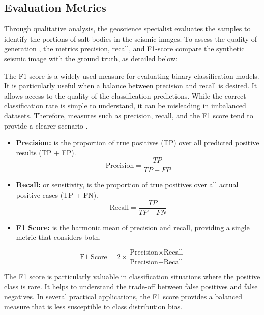 \documentclass{ieeeaccess}
\begin{document}
\subsection{Evaluation Metrics}

Through qualitative analysis, the geoscience specialist evaluates the samples to identify the portions of salt bodies in the seismic images. To assess the quality of generation , the metrics precision, recall, and F1-score compare the synthetic seismic image with the ground truth, as detailed below:

The F1 score is a widely used measure for evaluating binary classification models. It is particularly useful when a balance between precision and recall is desired. It allows access to the quality of the classification predictions. While the correct classification rate is simple to understand, it can be misleading in imbalanced datasets. Therefore, measures such as precision, recall, and the F1 score tend to provide a clearer scenario \cite{ref14}.

\begin{itemize}
    \item \textbf{Precision:} is the proportion of true positives (TP) over all predicted positive results (TP + FP).
    \begin{equation}
    \text{Precision} = \frac{TP}{TP + FP}
    \end{equation}

    \item \textbf{Recall:} or sensitivity, is the proportion of true positives over all actual positive cases (TP + FN).
    \begin{equation}
    \text{Recall} = \frac{TP}{TP + FN}
    \end{equation}


    \item \textbf{F1 Score:} is the harmonic mean of precision and recall, providing a single metric that considers both. 

\end{itemize}
    \begin{equation}
    \text{F1 Score} = 2 \times \frac{\text{Precision} \times \text{Recall}}{\text{Precision} + \text{Recall}}
    \end{equation}
    
 The F1 score is particularly valuable in classification situations where the positive class is rare. It helps to understand the trade-off between false positives and false negatives. In several practical applications, the F1 score provides a balanced measure that is less susceptible to class distribution bias.
\end{document}
